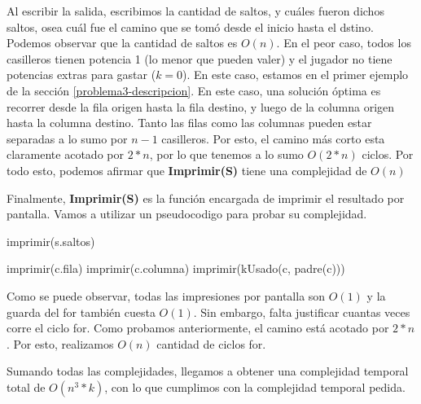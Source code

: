 Al escribir la salida, escribimos la cantidad de saltos, y cuáles fueron dichos saltos, osea cuál fue el camino que se tomó desde el inicio hasta el dstino. Podemos observar que la cantidad de saltos es $O(n)$. En el peor caso, todos los casilleros tienen potencia 1 (lo menor que pueden valer) y el jugador no tiene potencias extras para gastar ($k=0$). En este caso, estamos en el primer ejemplo de la sección  \ref{problema3-descripcion}. En este caso, una solución óptima es recorrer desde la fila origen hasta la fila destino, y luego de la columna origen hasta la columna destino. Tanto las filas como las columnas pueden estar separadas a lo sumo por $n-1$ casilleros. Por esto, el camino más corto esta claramente acotado por $2*n$, por lo que tenemos a lo sumo $O(2*n)$ ciclos. Por todo esto, podemos afirmar que \textbf{Imprimir(S)} tiene una complejidad de $O(n)$

Finalmente, \textbf{Imprimir(S)} es la función encargada de imprimir el resultado por pantalla. Vamos a utilizar un pseudocodigo para probar su complejidad.

\begin{pseudo}
        \State imprimir(s.saltos) 

		 
        \State imprimir(c.fila) 
        \State imprimir(c.columna) 
        \State imprimir(kUsado(c, padre(c))) 
      	\EndFor
        
    \EndProcedure
\end{pseudo}

Como se puede observar, todas las impresiones por pantalla son $O(1)$ y la guarda del for también cuesta $O(1)$. Sin embargo, falta justificar cuantas veces corre el ciclo for. Como probamos anteriormente, el camino está acotado por $2*n$. Por esto, realizamos $O(n)$ cantidad de ciclos for.

Sumando todas las complejidades, llegamos a obtener una complejidad temporal total de $O(n^3 * k)$, con lo que cumplimos con la complejidad temporal pedida.
